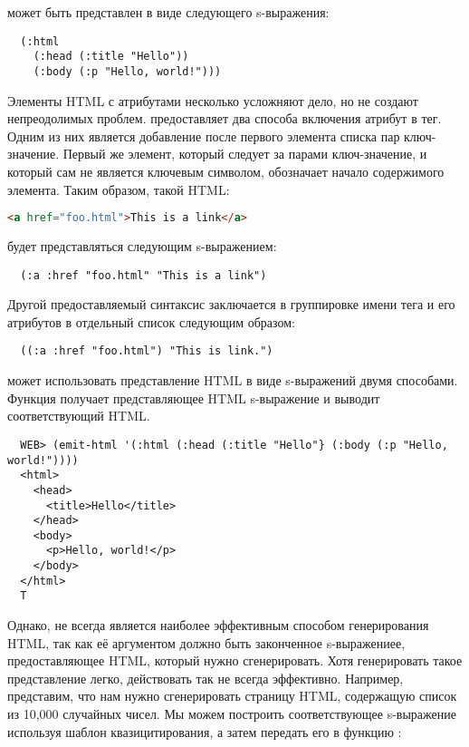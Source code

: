 может быть представлен в виде следующего s-выражения:

\begin{lstlisting}
  (:html
    (:head (:title "Hello"))
    (:body (:p "Hello, world!")))
\end{lstlisting}

Элементы HTML с атрибутами несколько усложняют дело, но не создают непреодолимых
проблем.  предоставляет два способа включения атрибут в тег. Одним из них
является добавление после первого элемента списка пар ключ-значение. Первый же элемент,
который следует за парами ключ-значение, и который сам не является ключевым символом,
обозначает начало содержимого элемента. Таким образом, такой HTML:

\begin{lstlisting}[language=HTML]
  <a href="foo.html">This is a link</a>
\end{lstlisting}

будет представляться следующим s-выражением:

\begin{lstlisting}
  (:a :href "foo.html" "This is a link")
\end{lstlisting}

Другой предоставляемый  синтаксис заключается в группировке имени тега и его
атрибутов в отдельный список следующим образом:

\begin{lstlisting}
  ((:a :href "foo.html") "This is link.")
\end{lstlisting}

 может использовать представление HTML в виде s-выражений двумя
способами. Функция  получает представляющее HTML s-выражение и выводит
соответствующий HTML.

\begin{lstlisting}
  WEB> (emit-html '(:html (:head (:title "Hello"} (:body (:p "Hello, world!"))))
  <html>
    <head>
      <title>Hello</title>
    </head>
    <body>
      <p>Hello, world!</p>
    </body>
  </html>
  T
\end{lstlisting}

Однако,  не всегда является наиболее эффективным способом генерирования
HTML, так как её аргументом должно быть законченное s-выражениее, предоставляющее HTML,
который нужно сгенерировать. Хотя генерировать такое представление легко, действовать так
не всегда эффективно. Например, представим, что нам нужно сгенерировать страницу HTML,
содержащую список из 10,000 случайных чисел. Мы можем построить соответствующее
s-выражение используя шаблон квазицитирования, а затем передать его в функцию
:

